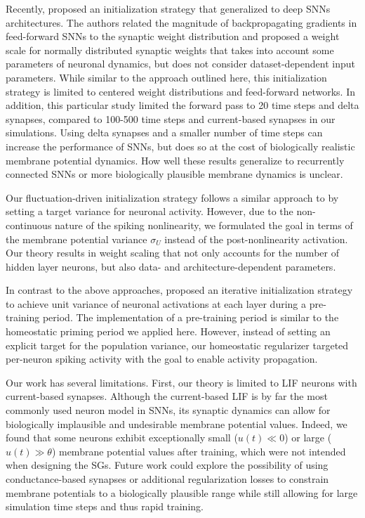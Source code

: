 \documentclass[11pt,a4paper]{article}
\begin{document}
Recently, \citet{Ding2021-ql} proposed an initialization strategy that generalized to deep \acp{SNN} architectures.
The authors related the magnitude of backpropagating gradients in feed-forward \acp{SNN} to the synaptic weight distribution and proposed a weight scale for normally distributed synaptic weights that takes into account some parameters of neuronal dynamics, but does not consider dataset-dependent input parameters. 
While similar to the approach outlined here, this initialization strategy is limited to centered weight distributions and feed-forward networks.
In addition, this particular study limited the forward pass to 20 time steps and delta synapses, compared to 100-500 time steps and current-based synapses in our simulations.
Using delta synapses and a smaller number of time steps can increase the performance of \acp{SNN}, but does so at the cost of biologically realistic membrane potential dynamics.
How well these results generalize to recurrently connected \acp{SNN} or more biologically plausible membrane dynamics is unclear.

Our fluctuation-driven initialization strategy follows a similar approach to \citet{Glorot2010-dj, He2015-kv} by setting a target variance for neuronal activity.
However, due to the non-continuous nature of the spiking nonlinearity, we formulated the goal in terms of the membrane potential variance $\sigma_U$ instead of the post-nonlinearity activation.
Our theory results in weight scaling that not only accounts for the number of hidden layer neurons, but also data- and architecture-dependent parameters.

In contrast to the above approaches, \citet{Mishkin2015-zd} proposed an iterative initialization strategy to achieve unit variance of neuronal activations at each layer during a pre-training period.
The implementation of a pre-training period is similar to the homeostatic priming period we applied here.
However, instead of setting an explicit target for the population variance, our homeostatic regularizer targeted per-neuron spiking activity with the goal to enable activity propagation.

\medskip
Our work has several limitations.
First, our theory is limited to \ac{LIF} neurons with current-based synapses. 
Although the current-based \ac{LIF} is by far the most commonly used neuron model in \acp{SNN}, its synaptic dynamics can allow for biologically implausible and undesirable membrane potential values. 
Indeed, we found that some neurons exhibit exceptionally small ($u(t) \ll 0$) or large ($u(t) \gg \theta$) membrane potential values after training, which were not intended when designing the \acp{SG}.
Future work could explore the possibility of using conductance-based synapses or additional regularization losses to constrain membrane potentials to a biologically plausible range while still allowing for large simulation time steps and thus rapid training.
\end{document}
